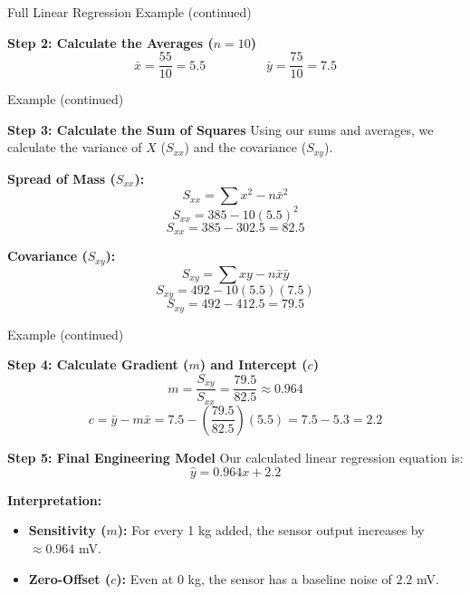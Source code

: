 \begin{frame}{Full Linear Regression Example (continued)}
   \begin{solutioncont}
        \textbf{Step 2: Calculate the Averages ($n=10$)}
        $$\bar{x} = \frac{55}{10} = 5.5 \hspace{2cm} \bar{y} = \frac{75}{10} = 7.5$$
    \end{solutioncont}
\end{frame}

\begin{frame}[plain]{Example (continued)}
    \begin{solutioncont}
        \textbf{Step 3: Calculate the Sum of Squares}
        Using our sums and averages, we calculate the variance of $X$ ($S_{xx}$) and the covariance ($S_{xy}$).

        \textbf{Spread of Mass ($S_{xx}$):}
        $$S_{xx} = \sum x^2 - n\bar{x}^2$$
        $$S_{xx} = 385 - 10(5.5)^2$$
        $$S_{xx} = 385 - 302.5 = 82.5$$
        
        \textbf{Covariance ($S_{xy}$):}
        $$S_{xy} = \sum xy - n\bar{x}\bar{y}$$
        $$S_{xy} = 492 - 10(5.5)(7.5)$$
        $$S_{xy} = 492 - 412.5 = 79.5$$
    \end{solutioncont}
\end{frame}

\begin{frame}[plain]{Example (continued)}
    \begin{solutioncont}
        \textbf{Step 4: Calculate Gradient ($m$) and Intercept ($c$)}
        $$m = \frac{S_{xy}}{S_{xx}} = \frac{79.5}{82.5} \approx 0.964$$
        $$c = \bar{y} - m\bar{x} = 7.5 - \left(\frac{79.5}{82.5}\right)(5.5) = 7.5 - 5.3 = 2.2$$
       
        \textbf{Step 5: Final Engineering Model}
        Our calculated linear regression equation is:
        $$\hat{y} = 0.964x + 2.2$$
        
        \textbf{Interpretation:} 
        \begin{itemize}
            \item \textbf{Sensitivity ($m$):} For every 1 kg added, the sensor output increases by $\approx 0.964$ mV.
            \item \textbf{Zero-Offset ($c$):} Even at 0 kg, the sensor has a baseline noise of $2.2$ mV.
        \end{itemize}
    \end{solutioncont}
\end{frame}

